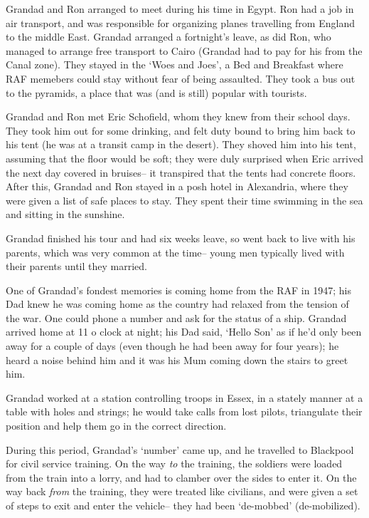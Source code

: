 \documentclass[11pt]{article}
\begin{document}
Grandad and Ron arranged to meet during his time in Egypt. Ron had a job 
in air transport, and was responsible for organizing planes travelling from England 
to the middle East. Grandad arranged a fortnight's leave, as did Ron, who 
managed to arrange free transport to Cairo (Grandad had to pay for his from 
the Canal zone). They stayed in the `Woes and Joes', a Bed and Breakfast where RAF memebers 
could stay without fear of being assaulted. They took a bus out to the pyramids, a place 
that was (and is still) popular with tourists.

Grandad and Ron met Eric Schofield, whom they knew from their school days. They
took him out for some drinking, and felt duty bound to bring him back to his tent (he was 
at a transit camp in the desert). They shoved him into his tent, assuming that 
the floor would be soft; they were duly surprised when Eric arrived the next day 
covered in bruises-- it transpired that the tents had concrete floors. After this, 
Grandad and Ron stayed in a posh hotel in Alexandria, where they were given 
a list of safe places to stay. They spent their time swimming in the sea 
and sitting in the sunshine.

  Grandad finished his tour and had six weeks leave, so went back to live with his parents, which was 
  very common at the time-- young men typically lived with their parents until they married. 

One of Grandad's fondest memories is coming home from the RAF in 1947; his Dad knew 
he was coming home  as the country had relaxed from the tension of the war. 
One could phone a number and ask for the status of a ship. Grandad arrived home at 
11 o clock at night; his Dad said, `Hello Son' as if he'd only been away for 
a couple of days (even though he had been away for four years); he heard a noise 
behind him and it was his Mum coming down the stairs to greet him.

  Grandad worked at a station controlling troops in Essex, in a stately manner at a table 
  with holes and strings; he would take calls from lost pilots, triangulate their position
  and help them go in the correct direction. 

  During this period, Grandad's `number' came up, and he travelled to Blackpool for 
  civil service training. On the way \emph{to} the training, the soldiers were loaded from 
  the train into a lorry, and had to clamber over the sides to enter it. On the 
  way back \emph{from} the training, they were treated like civilians, and were 
  given a set of steps to exit and enter the vehicle-- they had been `de-mobbed' (de-mobilized).
\end{document}
